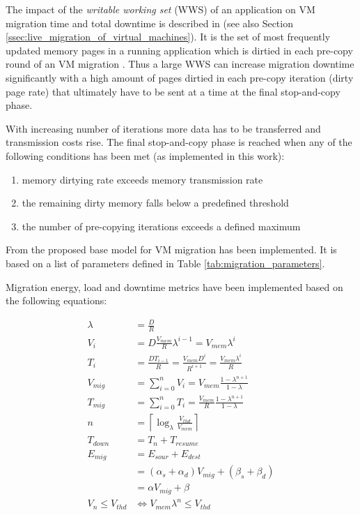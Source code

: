 The impact of the \textit{writable working set} (WWS) of an application on VM migration time and total downtime is described in \cite{clark2005live} (see also Section \ref{ssec:live_migration_of_virtual_machines}). It is the set of most frequently updated memory pages in a running application which is dirtied in each pre-copy round of an VM migration \cite{clark2005live, liu2013performance}. Thus a large WWS can increase migration downtime significantly with a high amount of pages dirtied in each pre-copy iteration (dirty page rate) that ultimately have to be sent at a time at the final stop-and-copy phase. 

With increasing number of iterations more data has to be transferred and transmission costs rise. The final stop-and-copy phase is reached when any of the following conditions has been met (as implemented in this work): 

\begin{enumerate}[label=\textnormal{(\arabic*)}]
	\item memory dirtying rate exceeds memory transmission rate \label{itm:condition1}
	\item the remaining dirty memory falls below a predefined threshold \label{itm:condition2}
	\item the number of pre-copying iterations exceeds a defined maximum \label{itm:condition3}
\end{enumerate}

From \cite{liu2013performance} the proposed base model for VM migration has been implemented. It is based on a list of parameters defined in Table \ref{tab:migration_parameters}. 

Migration energy, load and downtime metrics have been implemented based on the following equations: 

\begin{align}
	\lambda &= \frac{D}{R} \label{eq:m_lambda} \\
	V_i &= D \frac{V_{mem}}{R} \lambda^{i-1} = V_{mem} \lambda^i \label{eq:m_v_i} \\
	T_i &= \frac{D T_{i-1}}{R} = \frac{V_{mem} D^i}{R^{i+1}} = \frac{V_{mem} \lambda^i}{R} \label{eq:m_t_i} \\
	V_{mig} &= \sum_{i=0}^n V_i = V_{mem} \frac{1 - \lambda^{n+1}}{1 - \lambda} \label{eq:m_v_mig} \\
	T_{mig} &= \sum_{i=0}^n T_i = \frac{V_{mem}}{R} \frac{1 - \lambda^{n+1}}{1 - \lambda} \label{eq:m_t_mig} \\
	n &= \left\lceil \log_{\lambda} \frac{V_{thd}}{V_{mem}} \right\rceil \label{eq:m_n} \\
	T_{down} &= T_n + T_{resume} \label{eq:m_t_down} \\
	E_{mig} &= E_{sour} + E_{dest} \label{eq:m_e_mig} \\
	&= (\alpha_s + \alpha_d) V_{mig} + (\beta_s + \beta_d) \nonumber \\
	&= \alpha V_{mig} + \beta \nonumber \\
	V_n \le V_{thd} &\Leftrightarrow V_{mem} \lambda^n \le V_{thd} \label{eq:m_v_n}
\end{align}


